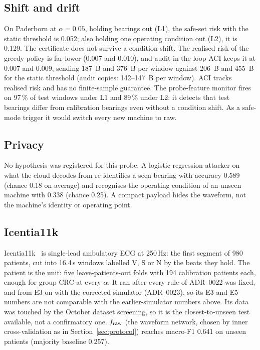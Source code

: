 \subsection{Shift and drift}
\label{sec:res-drift}

On Paderborn at $\alpha = 0.05$, holding bearings out (L1), the safe-set risk with the static
threshold is 0.052; also holding one operating condition out (L2), it is 0.129. The certificate
does not survive a condition shift. The realised risk of the greedy policy is far lower (0.007 and
0.010), and audit-in-the-loop ACI keeps it at 0.007 and 0.009, sending 187~B and 376~B per window
against 206~B and 455~B for the static threshold (audit copies: 142--147~B per window). ACI tracks
realised risk and has no finite-sample guarantee. The probe-feature monitor fires on 97\,\% of test
windows under L1 and 89\,\% under L2: it detects that test bearings differ from calibration
bearings even without a condition shift. As a safe-mode trigger it would switch every new machine
to raw.

\subsection{Privacy\expl}
\label{sec:res-privacy}

No hypothesis was registered for this probe. A logistic-regression attacker on what the cloud
decodes from  re-identifies a seen bearing with accuracy 0.589 (chance 0.18 on average) and
recognises the operating condition of an unseen machine with 0.338 (chance 0.25). A compact payload
hides the waveform, not the machine's identity or operating point.

\subsection{Icentia11k}
\label{sec:res-icentia}

Icentia11k~\cite{tan2019icentia} is single-lead ambulatory ECG at 250\,Hz: the first segment of 980
patients, cut into 16.4\,s windows labelled V, S or N by the beats they hold. The patient is the
unit: five leave-patients-out folds with 194 calibration patients each, enough for group CRC at
every $\alpha$. It ran after every rule of ADR~0022 was fixed, and from E3 on with the corrected
simulator (ADR~0023), so its E3 and E5 numbers are not comparable with the earlier-simulator
numbers above. Its data was touched by the October dataset screening, so it is the
closest-to-unseen test available, not a confirmatory one. $f_{\mathrm{raw}}$ (the waveform network, chosen by
inner cross-validation as in Section~\ref{sec:protocol}) reaches macro-F1 0.641 on unseen patients
(majority baseline 0.257).

